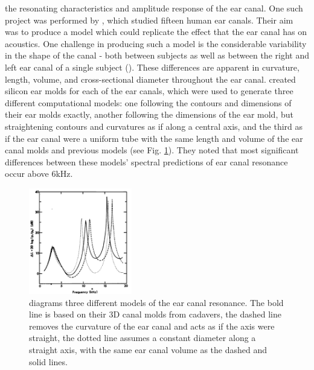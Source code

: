 \DIFaddend the resonating characteristics and amplitude response of the ear canal.  One such project was performed by \cite{stinson:89}, which studied fifteen human ear canals.  Their aim was to produce a model which could replicate the effect that the ear canal has on acoustics.
One challenge in producing such a model is the considerable variability in the shape of the canal - both between subjects as well as between the right and left ear canal of a single subject (\cite{stinson:89}).  These differences are apparent in curvature, length, volume, and cross-sectional diameter throughout the ear canal.  \cite{stinson:89} created silicon ear molds for each of the ear canals, which were used to generate three different computational models: one following the contours and dimensions of their ear molds exactly, another following the dimensions of the ear mold, but straightening contours and curvatures as if along a central axis, and the third as if the ear canal were a uniform tube with the same length and volume of the ear canal molds and previous models (see Fig. \ref{fig:eac_modelling}).  They noted that most significant differences between these models' spectral predictions of ear canal resonance occur above 6kHz.

%
\begin{figure}[h!]
\centering
  \includegraphics[width=0.4\textwidth]{figure/eac_mod_diffs.png}
  \caption{\cite{stinson:89} diagrams three different models of the ear canal resonance.  The bold line is based on their 3D canal molds from cadavers, the dashed line removes the curvature of the ear canal and acts as if the axis were straight, the dotted line assumes a constant diameter along a straight axis, with the same ear canal volume as the dashed and solid lines.}
  \label{fig:eac_modelling}
\end{figure}
%

